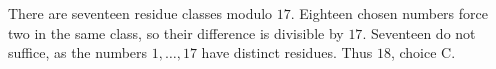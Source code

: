 There are seventeen residue classes modulo $17$. Eighteen chosen numbers force two in the same class, so their difference is divisible by $17$. Seventeen do not suffice, as the numbers $1,\ldots,17$ have distinct residues. Thus $\boxed{18}$, choice C.
